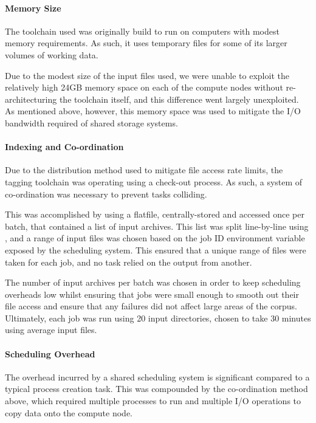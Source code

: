 \paragraph{Memory Size}
The toolchain used was originally build to run on computers with modest memory requirements.  As such, it uses temporary files for some of its larger volumes of working data.

Due to the modest size of the input files used, we were unable to exploit the relatively high 24GB memory space on each of the compute nodes without re-architecturing the toolchain itself, and this difference went largely unexploited.  As mentioned above, however, this memory space was used to mitigate the I/O bandwidth required of shared storage systems.






\paragraph{Indexing and Co-ordination}
Due to the distribution method used to mitigate file access rate limits, the tagging toolchain was operating using a check-out process.  As such, a system of co-ordination was necessary to prevent tasks colliding.

This was accomplished by using a flatfile, centrally-stored and accessed once per batch, that contained a list of input archives.  This list was split line-by-line using , and a range of input files was chosen based on the job ID environment variable exposed by the scheduling system.  This ensured that a unique range of files were taken for each job, and no task relied on the output from another.

The number of input archives per batch was chosen in order to keep scheduling overheads low whilst ensuring that jobs were small enough to smooth out their file access and ensure that any failures did not affect large areas of the corpus.  Ultimately, each job was run using 20 input directories, chosen to take 30 minutes using average input files.


\paragraph{Scheduling Overhead}
The overhead incurred by a shared scheduling system is significant compared to a typical process creation task.  This was compounded by the co-ordination method above, which required multiple processes to run and multiple I/O operations to copy data onto the compute node.

